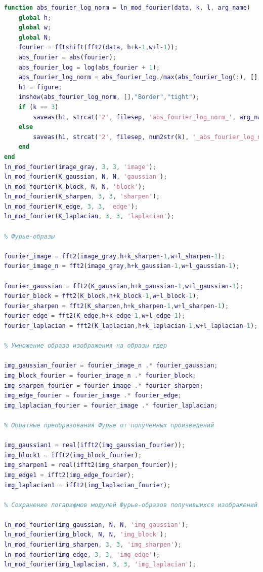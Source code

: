 \documentclass[a4paper]{article}
\begin{document}
\begin{lstlisting}[caption={Код для построения графиков для задания 2}, language=matlab]
function abs_fourier_log_norm = ln_mod_fourier(data, k, l, arg_name)
    global h;
    global w;
    global N;
    fourier = fftshift(fft2(data, h+k-1,w+l-1));
    abs_fourier = abs(fourier);
    abs_fourier_log = log(abs_fourier + 1);
    abs_fourier_log_norm = abs_fourier_log./max(abs_fourier_log(:), [], 'all');
    h1 = figure;
    imshow(abs_fourier_log_norm, [],"Border","tight");
    if (k == 3)
        saveas(h1, strcat('2', filesep, 'abs_fourier_log_norm_', arg_name, '.png'), 'png');
    else
        saveas(h1, strcat('2', filesep, num2str(k), '_abs_fourier_log_norm_', arg_name, '.png'), 'png');
    end
end
ln_mod_fourier(image_gray, 3, 3, 'image');
ln_mod_fourier(K_gaussian, N, N, 'gaussian');
ln_mod_fourier(K_block, N, N, 'block');
ln_mod_fourier(K_sharpen, 3, 3, 'sharpen');
ln_mod_fourier(K_edge, 3, 3, 'edge');
ln_mod_fourier(K_laplacian, 3, 3, 'laplacian');

% Фурье-образы

fourier_image = fft2(image_gray,h+k_sharpen-1,w+l_sharpen-1);
fourier_image_n = fft2(image_gray,h+k_gaussian-1,w+l_gaussian-1);

fourier_gaussian = fft2(K_gaussian,h+k_gaussian-1,w+l_gaussian-1);
fourier_block = fft2(K_block,h+k_block-1,w+l_block-1);
fourier_sharpen = fft2(K_sharpen,h+k_sharpen-1,w+l_sharpen-1);
fourier_edge = fft2(K_edge,h+k_edge-1,w+l_edge-1);
fourier_laplacian = fft2(K_laplacian,h+k_laplacian-1,w+l_laplacian-1);

% Умножение образа изображения на образы ядер

img_gaussian_fourier = fourier_image_n .* fourier_gaussian;
img_block_fourier = fourier_image_n .* fourier_block;
img_sharpen_fourier = fourier_image .* fourier_sharpen;
img_edge_fourier = fourier_image .* fourier_edge;
img_laplacian_fourier = fourier_image .* fourier_laplacian;

% Обратные преобразования Фурье от полученных произведений

img_gaussian1 = real(ifft2(img_gaussian_fourier));
img_block1 = ifft2(img_block_fourier);
img_sharpen1 = real(ifft2(img_sharpen_fourier));
img_edge1 = ifft2(img_edge_fourier);
img_laplacian1 = ifft2(img_laplacian_fourier);

% Сохранение логарифмов модулей Фурье-образов получившихся изображений (сначала conv2, затем фурье)

ln_mod_fourier(img_gaussian, N, N, 'img_gaussian');
ln_mod_fourier(img_block, N, N, 'img_block');
ln_mod_fourier(img_sharpen, 3, 3, 'img_sharpen');
ln_mod_fourier(img_edge, 3, 3, 'img_edge');
ln_mod_fourier(img_laplacian, 3, 3, 'img_laplacian');


\end{lstlisting}
\end{document}
